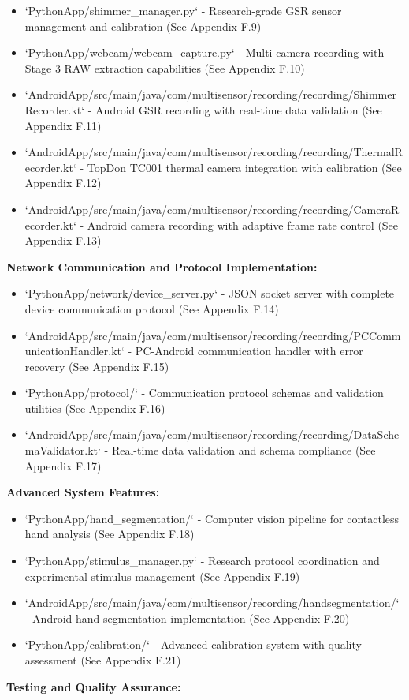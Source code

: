 \documentclass[11pt,a4paper]{article}
\begin{document}
\begin{itemize}
\item `PythonApp/shimmer_manager.py` - Research-grade GSR sensor management and
calibration (See Appendix F.9)
\item `PythonApp/webcam/webcam_capture.py` - Multi-camera recording with Stage 3
RAW extraction capabilities (See
  Appendix F.10)
\item
`AndroidApp/src/main/java/com/multisensor/recording/recording/ShimmerRecorder.kt`
- Android GSR recording with
  real-time data validation (See Appendix F.11)
\item
`AndroidApp/src/main/java/com/multisensor/recording/recording/ThermalRecorder.kt`
- TopDon TC001 thermal camera
  integration with calibration (See Appendix F.12)
\item
`AndroidApp/src/main/java/com/multisensor/recording/recording/CameraRecorder.kt`
- Android camera recording with
  adaptive frame rate control (See Appendix F.13)

\end{itemize}
\textbf{Network Communication and Protocol Implementation:}

\begin{itemize}
\item `PythonApp/network/device_server.py` - JSON socket server with complete
device communication protocol (See
  Appendix F.14)
\item
`AndroidApp/src/main/java/com/multisensor/recording/recording/PCCommunicationHandler.kt`
- PC-Android communication
  handler with error recovery (See Appendix F.15)
\item `PythonApp/protocol/` - Communication protocol schemas and validation
utilities (See Appendix F.16)
\item
`AndroidApp/src/main/java/com/multisensor/recording/recording/DataSchemaValidator.kt`
- Real-time data validation and
  schema compliance (See Appendix F.17)

\end{itemize}
\textbf{Advanced System Features:}

\begin{itemize}
\item `PythonApp/hand_segmentation/` - Computer vision pipeline for contactless
hand analysis (See Appendix F.18)
\item `PythonApp/stimulus_manager.py` - Research protocol coordination and
experimental stimulus management (See
  Appendix F.19)
\item `AndroidApp/src/main/java/com/multisensor/recording/handsegmentation/` -
Android hand segmentation implementation (See
  Appendix F.20)
\item `PythonApp/calibration/` - Advanced calibration system with quality
assessment (See Appendix F.21)

\end{itemize}
\textbf{Testing and Quality Assurance:}
\end{document}

